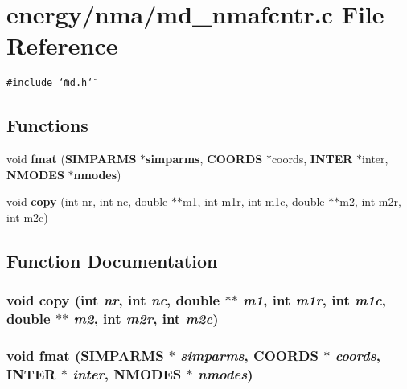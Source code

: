 \section{energy/nma/md\_\-nmafcntr.c File Reference}
\label{md__nmafcntr_8c}
{\tt \#include \char`\"{}md.h\char`\"{}}\par
\subsection*{Functions}
\begin{CompactItemize}
\item 
void {\bf fmat} ({\bf SIMPARMS} $\ast${\bf simparms}, {\bf COORDS} $\ast$coords, {\bf INTER} $\ast$inter, {\bf NMODES} $\ast${\bf nmodes})
\item 
void {\bf copy} (int nr, int nc, double $\ast$$\ast$m1, int m1r, int m1c, double $\ast$$\ast$m2, int m2r, int m2c)
\end{CompactItemize}


\subsection{Function Documentation}
\subsubsection{\setlength{\rightskip}{0pt plus 5cm}void copy (int {\em nr}, int {\em nc}, double $\ast$$\ast$ {\em m1}, int {\em m1r}, int {\em m1c}, double $\ast$$\ast$ {\em m2}, int {\em m2r}, int {\em m2c})}\label{md__nmafcntr_8c_07ca54c15d274d595d7d09cfef9d9015}


\subsubsection{\setlength{\rightskip}{0pt plus 5cm}void fmat ({\bf SIMPARMS} $\ast$ {\em simparms}, {\bf COORDS} $\ast$ {\em coords}, {\bf INTER} $\ast$ {\em inter}, {\bf NMODES} $\ast$ {\em nmodes})}\label{md__nmafcntr_8c_b5351198b4ab123233cf8a7c64a7e2b7}


